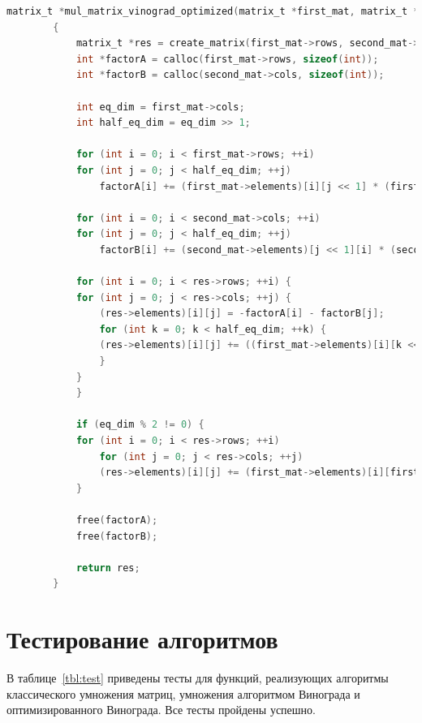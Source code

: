 \documentclass[12pt]{report}
\begin{document}
	\bigbreak

	\begin{lstlisting}[label=damlevrec,caption=Листинг оптимизированного алгоритма Винограда умножения матриц,language=C]
		matrix_t *mul_matrix_vinograd_optimized(matrix_t *first_mat, matrix_t *second_mat)
		{
		    matrix_t *res = create_matrix(first_mat->rows, second_mat->cols);
		    int *factorA = calloc(first_mat->rows, sizeof(int));
		    int *factorB = calloc(second_mat->cols, sizeof(int));

		    int eq_dim = first_mat->cols;
		    int half_eq_dim = eq_dim >> 1;

		    for (int i = 0; i < first_mat->rows; ++i)
			for (int j = 0; j < half_eq_dim; ++j)
			    factorA[i] += (first_mat->elements)[i][j << 1] * (first_mat->elements)[i][(j << 1) + 1];

		    for (int i = 0; i < second_mat->cols; ++i)
			for (int j = 0; j < half_eq_dim; ++j)
			    factorB[i] += (second_mat->elements)[j << 1][i] * (second_mat->elements)[(j << 1) + 1][i];

		    for (int i = 0; i < res->rows; ++i) {
			for (int j = 0; j < res->cols; ++j) {
			    (res->elements)[i][j] = -factorA[i] - factorB[j];
			    for (int k = 0; k < half_eq_dim; ++k) {
				(res->elements)[i][j] += ((first_mat->elements)[i][k << 1] + (second_mat->elements)[(k << 1) + 1][j]) * ((first_mat->elements)[i][(k << 1) + 1] + (second_mat->elements)[(k << 1)][j]);
			    }
			}
		    }

		    if (eq_dim % 2 != 0) {
			for (int i = 0; i < res->rows; ++i)
			    for (int j = 0; j < res->cols; ++j)
				(res->elements)[i][j] += (first_mat->elements)[i][first_mat->cols - 1] * (second_mat->elements)[second_mat->rows - 1][j];
		    }

		    free(factorA);
		    free(factorB);

		    return res;
		}
	\end{lstlisting}

	\section{Тестирование алгоритмов}

	В таблице~\ref{tbl:test} приведены тесты для функций, реализующих алгоритмы классического умножения матриц, умножения алгоритмом Винограда и оптимизированного Винограда. Все тесты пройдены успешно.
	
\end{document}
